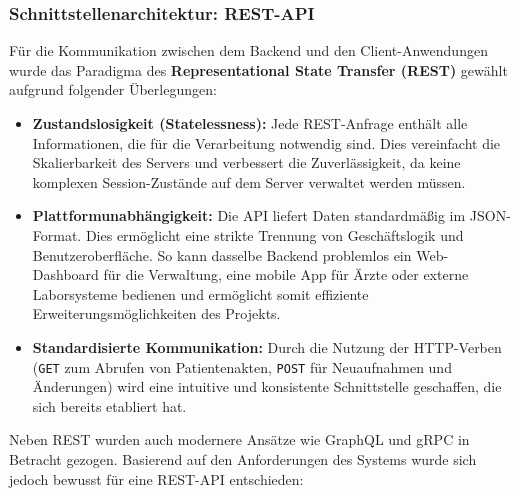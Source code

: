 \subsubsection{Schnittstellenarchitektur: REST-API}
Für die Kommunikation zwischen dem Backend und den Client-Anwendungen wurde das Paradigma des \textbf{Representational State Transfer (REST)} gewählt aufgrund folgender Überlegungen:

\begin{itemize}
    \item \textbf{Zustandslosigkeit (Statelessness):} Jede REST-Anfrage enthält alle Informationen, die für die Verarbeitung notwendig sind. Dies vereinfacht die Skalierbarkeit des Servers und verbessert die Zuverlässigkeit, da keine komplexen Session-Zustände auf dem Server verwaltet werden müssen.
    \item \textbf{Plattformunabhängigkeit:} Die API liefert Daten standardmäßig im JSON-Format. Dies ermöglicht eine strikte Trennung von Geschäftslogik und Benutzeroberfläche. So kann dasselbe Backend problemlos ein Web-Dashboard für die Verwaltung, eine mobile App für Ärzte oder externe Laborsysteme bedienen und ermöglicht somit effiziente Erweiterungsmöglichkeiten des Projekts.
    \item \textbf{Standardisierte Kommunikation:} Durch die Nutzung der HTTP-Verben (\texttt{GET} zum Abrufen von Patientenakten, \texttt{POST} für Neuaufnahmen und Änderungen) wird eine intuitive und konsistente Schnittstelle geschaffen, die sich bereits etabliert hat.
\end{itemize}

Neben REST wurden auch modernere Ansätze wie GraphQL und gRPC in Betracht gezogen. Basierend auf den Anforderungen des Systems wurde sich jedoch bewusst für eine REST-API entschieden:


